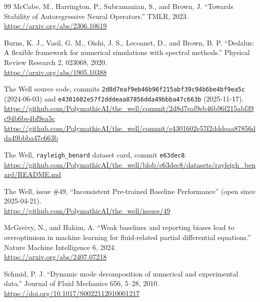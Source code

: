 \documentclass[11pt]{article}
\begin{document}
\begin{thebibliography}{99}
McCabe, M., Harrington, P., Subramanian, S., and Brown, J.
``Towards Stability of Autoregressive Neural Operators.''
TMLR, 2023.\\
\url{https://arxiv.org/abs/2306.10619}

Burns, K. J., Vasil, G. M., Oishi, J. S., Lecoanet, D., and Brown, B. P.
``Dedalus: A flexible framework for numerical simulations with spectral methods.''
Physical Review Research 2, 023068, 2020.\\
\url{https://arxiv.org/abs/1905.10388}

The Well source code, commits \texttt{2d8d7eaf9eb46b96f215abf39c94b6be4bf9ea5c} (2024-06-03) and
\texttt{e4301602e57f2dddeaa87856dda49bbba47c663b} (2025-11-17).\\
\url{https://github.com/PolymathicAI/the_well/commit/2d8d7eaf9eb46b96f215abf39c94b6be4bf9ea5c}\\
\url{https://github.com/PolymathicAI/the_well/commit/e4301602e57f2dddeaa87856dda49bbba47c663b}

The Well, \texttt{rayleigh\_benard} dataset card, commit \texttt{e63dec8}.\\
\url{https://github.com/PolymathicAI/the_well/blob/e63dec8/datasets/rayleigh_benard/README.md}

The Well, issue \#49, ``Inconsistent Pre-trained Baseline Performance'' (open since 2025-04-21).\\
\url{https://github.com/PolymathicAI/the_well/issues/49}

McGreivy, N., and Hakim, A.
``Weak baselines and reporting biases lead to overoptimism in machine learning for fluid-related partial
differential equations.''
Nature Machine Intelligence 6, 2024.\\
\url{https://arxiv.org/abs/2407.07218}

Schmid, P. J.
``Dynamic mode decomposition of numerical and experimental data.''
Journal of Fluid Mechanics 656, 5--28, 2010.\\
\url{https://doi.org/10.1017/S0022112010001217}

\end{thebibliography}
\end{document}
